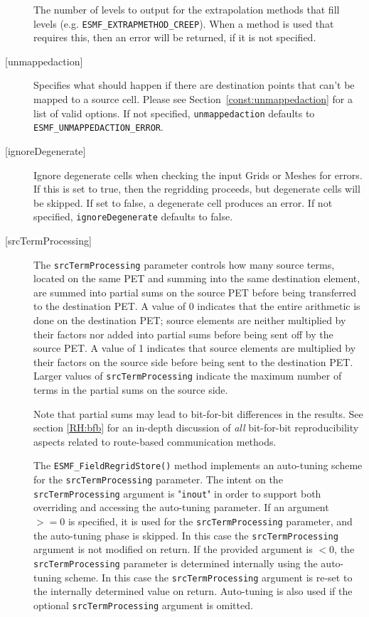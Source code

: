 \begin{description}
             The number of levels to output for the extrapolation methods that fill levels
             (e.g. {\tt ESMF\_EXTRAPMETHOD\_CREEP}). When a method is used that requires this, then an error will be returned, if it 
             is not specified.
       \item [{[unmappedaction]}]
             Specifies what should happen if there are destination points that
             can't be mapped to a source cell. Please see Section~\ref{const:unmappedaction} for a 
             list of valid options. If not specified, {\tt unmappedaction} defaults to {\tt ESMF\_UNMAPPEDACTION\_ERROR}. 
       \item [{[ignoreDegenerate]}]
             Ignore degenerate cells when checking the input Grids or Meshes for errors. If this is set to true, then the 
             regridding proceeds, but degenerate cells will be skipped. If set to false, a degenerate cell produces an error. 
             If not specified, {\tt ignoreDegenerate} defaults to false.
       \item [{[srcTermProcessing]}]
             The {\tt srcTermProcessing} parameter controls how many source terms,
             located on the same PET and summing into the same destination element,
             are summed into partial sums on the source PET before being transferred
             to the destination PET. A value of 0 indicates that the entire arithmetic
             is done on the destination PET; source elements are neither multiplied 
             by their factors nor added into partial sums before being sent off by the
             source PET. A value of 1 indicates that source elements are multiplied
             by their factors on the source side before being sent to the destination
             PET. Larger values of {\tt srcTermProcessing} indicate the maximum number
             of terms in the partial sums on the source side.
  
       Note that partial sums may lead to bit-for-bit differences in the results.
       See section \ref{RH:bfb} for an in-depth discussion of {\em all}
       bit-for-bit reproducibility aspects related to route-based communication
       methods.
  
       \begin{sloppypar}
       The {\tt ESMF\_FieldRegridStore()} method implements an auto-tuning scheme
       for the {\tt srcTermProcessing} parameter. The intent on the 
       {\tt srcTermProcessing} argument is "{\tt inout}" in order to 
       support both overriding and accessing the auto-tuning parameter.
       If an argument $>= 0$ is specified, it is used for the 
       {\tt srcTermProcessing} parameter, and the auto-tuning phase is skipped.
       In this case the {\tt srcTermProcessing} argument is not modified on
       return. If the provided argument is $< 0$, the {\tt srcTermProcessing}
       parameter is determined internally using the auto-tuning scheme. In this
       case the {\tt srcTermProcessing} argument is re-set to the internally
       determined value on return. Auto-tuning is also used if the optional 
       {\tt srcTermProcessing} argument is omitted.
       \end{sloppypar}
       

\end{description}
